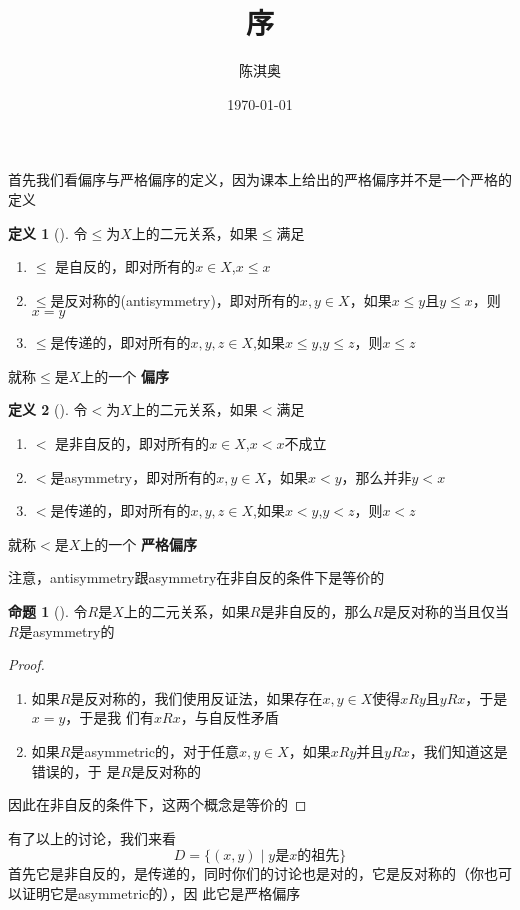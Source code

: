 \documentclass[11pt]{article}
\author{陈淇奥}
\date{\today}
\title{序}
\theoremstyle{definition}
\newtheorem{definition}{定义}
\newtheorem{proposition}{命题}
\begin{document}
\maketitle
首先我们看偏序与严格偏序的定义，因为课本上给出的严格偏序并不是一个严格的定义
\begin{definition}[]
令\(\le\)为\(X\)上的二元关系，如果\(\le\)满足
\begin{enumerate}
\item \(\le\) 是自反的，即对所有的\(x\in X\),\(x\le x\)
\item \(\le\)是反对称的(antisymmetry)，即对所有的\(x,y\in X\)，如果\(x\le y\)且\(y\le x\)，则\(x=y\)
\item \(\le\)是传递的，即对所有的\(x,y,z\in X\),如果\(x\le y\),\(y\le z\)，则\(x\le z\)
\end{enumerate}


就称\(\le\)是\(X\)上的一个 \textbf{偏序}
\end{definition}

\begin{definition}[]
令\(<\)为\(X\)上的二元关系，如果\(<\)满足
\begin{enumerate}
\item \(<\) 是非自反的，即对所有的\(x\in X\),\(x< x\)不成立
\item \(<\)是asymmetry，即对所有的\(x,y\in X\)，如果\(x< y\)，那么并非\(y<x\)
\item \(<\)是传递的，即对所有的\(x,y,z\in X\),如果\(x< y\),\(y< z\)，则\(x< z\)
\end{enumerate}


就称\(<\)是\(X\)上的一个 \textbf{严格偏序}
\end{definition}

注意，antisymmetry跟asymmetry在非自反的条件下是等价的

\begin{proposition}[]
令\(R\)是\(X\)上的二元关系，如果\(R\)是非自反的，那么\(R\)是反对称的当且仅当\(R\)是asymmetry的
\end{proposition}

\begin{proof}
\begin{enumerate}
\item 如果\(R\)是反对称的，我们使用反证法，如果存在\(x,y\in X\)使得\(xRy\)且\(yRx\)，于是\(x=y\)，于是我
们有\(xRx\)，与自反性矛盾
\item 如果\(R\)是asymmetric的，对于任意\(x,y\in X\)，如果\(xRy\)并且\(yRx\)，我们知道这是错误的，于
是\(R\)是反对称的
\end{enumerate}


因此在非自反的条件下，这两个概念是等价的
\end{proof}

有了以上的讨论，我们来看
\begin{equation*}
D=\{(x,y)\mid y\text{是$x$的祖先}\}
\end{equation*}
首先它是非自反的，是传递的，同时你们的讨论也是对的，它是反对称的（你也可以证明它是asymmetric的），因
此它是严格偏序
\end{document}
